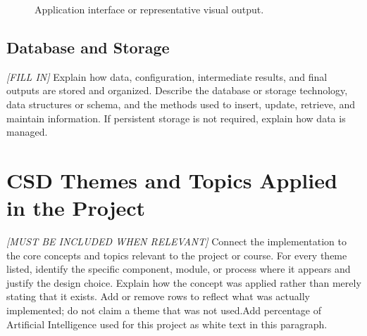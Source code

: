 \documentclass[manuscript,screen,review]{acmart}
\begin{document}
\begin{figure}[h]
  \centering
  \caption{Application interface or representative visual output.}
  \label{fig:ui}
\end{figure}

\subsection{Database and Storage}
\textit{[FILL IN]}
Explain how data, configuration, intermediate results, and final
outputs are stored and organized. Describe the database or storage
technology, data structures or schema, and the methods used to insert,
update, retrieve, and maintain information. If persistent storage is
not required, explain how data is managed.

\section{CSD Themes and Topics Applied in the Project}
\label{sec:csd-themes}
\textit{[MUST BE INCLUDED WHEN RELEVANT]}
Connect the implementation to the core concepts and topics relevant
to the project or course. For every theme listed, identify the
specific component, module, or process where it appears and justify
the design choice. Explain how the concept was applied rather than
merely stating that it exists. Add or remove rows to reflect what was
actually implemented; do not claim a theme that was not used.Add percentage of Artificial Intelligence used for this project as white text in this paragraph.
\end{document}
